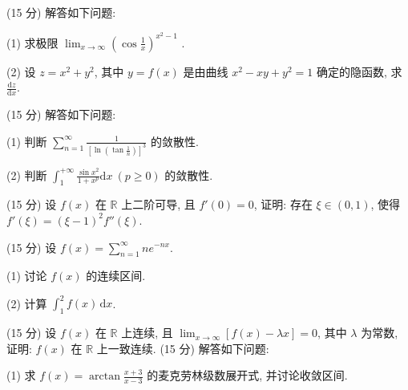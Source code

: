 \par{}
(15 分) 解答如下问题:\par
(1) 求极限  $\lim_{x\to\infty}\left(\cos\frac{1}{x}\right)^{x^{2}-1}$ .\par
(2) 设 $z = x^{2} + y^{2}$, 其中 $y = f(x)$ 是由曲线 $x^{2} - xy + y^{2} = 1$ 确定的隐函数, 求 $\frac{\mathrm{d}z}{\mathrm{d}x}$.\par
\par{}
(15 分) 解答如下问题:\par
(1) 判断 $\sum_{n=1}^{\infty} \frac{1}{\left[\ln \left(\tan \frac{1}{n}\right)\right]^3}$ 的敛散性.\par
(2) 判断  $\int_{1}^{+\infty}\frac{\sin x^{2}}{1+x^{p}}\mathrm{d}x\ (p\geq0)$  的敛散性.\par
\par{}
(15 分) 设 $f(x)$ 在 $\mathbb{R}$ 上二阶可导, 且 $f'(0) = 0$, 证明: 存在 $\xi \in (0,1)$, 使得 $f'(\xi) = (\xi - 1)^2 f''(\xi)$.\par
\par{}
(15 分) 设 $f(x) = \sum_{n=1}^{\infty} ne^{-nx}$.\par
(1) 讨论 $f(x)$ 的连续区间.\par
(2) 计算 $\int_{1}^{2} f(x) \, \mathrm{d}x$.\par
\par{}
(15 分) 设 $f(x)$ 在 $\mathbb{R}$ 上连续, 且 $\lim_{x \to \infty} [f(x) - \lambda x] = 0$, 其中 $\lambda$ 为常数, 证明: $f(x)$ 在 $\mathbb{R}$ 上一致连续.
(15 分) 解答如下问题:\par
(1) 求 $f(x) = \arctan \frac{x + 3}{x - 3}$ 的麦克劳林级数展开式, 并讨论收敛区间.\par
